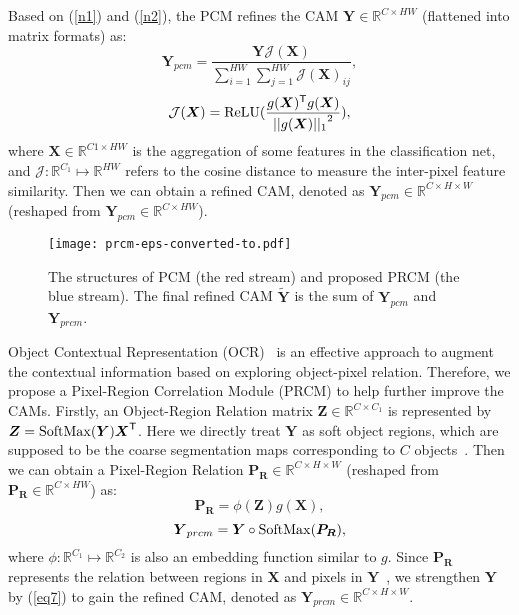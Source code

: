 \documentclass[10pt,twocolumn,letterpaper]{article}
\begin{document}
Based on (\ref{n1}) and (\ref{n2}), the PCM refines the CAM $\boldsymbol{Y} \in \mathbb{R}^{C \times HW}$ (flattened into matrix formats) as:
\begin{equation}\label{eq4}
{\boldsymbol{Y}_{pcm}} = \frac{\boldsymbol{Y}\mathcal{J}(\boldsymbol{X})}{\sum\nolimits_{i = 1}^{HW} {\sum\nolimits_{j = 1}^{HW}\mathcal{J}(\boldsymbol{X})_{ij}}},
\end{equation}
\begin{equation}\label{eq5}
\mathcal{J}(\boldsymbol{X}) = {\mathop{\rm ReLU}}(\frac{g(\boldsymbol{X})^\mathsf{T}g(\boldsymbol{X})} {{||g(\boldsymbol{X})||_1}^2}),
\end{equation}
where $\boldsymbol{X} \in \mathbb{R}^{C1 \times HW}$ is the aggregation of some features in the classification net, and $\mathcal{J}:\mathbb{R}^{C_1}\mapsto\mathbb{R}^{HW}$ refers to the cosine distance to measure the inter-pixel feature similarity. Then we can obtain a refined CAM, denoted as ${\boldsymbol{Y}_{pcm}} \in {\mathbb{R}^{C \times H \times W}}$ (reshaped from ${\boldsymbol{Y}_{pcm}} \in {\mathbb{R}^{C \times HW}}$).
\begin{figure}
\begin{center}
\texttt{[image: prcm-eps-converted-to.pdf]}
\end{center}
\vspace{-4mm}
   \caption{The structures of PCM (the red stream) and proposed PRCM (the blue stream). The final refined CAM $\widetilde {\boldsymbol{Y}}$ is the sum of $\boldsymbol{Y}_{pcm}$ and $\boldsymbol{Y}_{prcm}$.}
\label{fig:prcm}
\vspace{-2mm}
\end{figure}

Object Contextual Representation (OCR)~\cite{OCR} is an effective approach to augment the contextual information based on exploring object-pixel relation. Therefore, we propose a Pixel-Region Correlation Module (PRCM) to help further improve the CAMs. Firstly, an Object-Region Relation matrix $\boldsymbol{Z} \in {\mathbb{R}^{C \times C_1}}$ is represented by $\boldsymbol{Z} = \mathop{\rm SoftMax}(\boldsymbol{Y})\boldsymbol{X}^\mathsf{T}$. Here we directly treat $\boldsymbol{Y}$ as soft object regions, which are supposed to be the coarse segmentation maps corresponding to $C$ objects~\cite{OCR}. Then we can obtain a Pixel-Region Relation $ {\boldsymbol{P_{R}}} \in {\mathbb{R}^{C \times H \times W}}$ (reshaped from $ \boldsymbol{P_{R}} \in {\mathbb{R}^{C \times HW}}$) as:
\begin{equation}\label{eq6}
\boldsymbol {P_{R}} = \phi (\boldsymbol{Z})g(\boldsymbol{X}),
\end{equation}
\begin{equation}\label{eq7}
\boldsymbol{Y}_{prcm} = {\boldsymbol{Y}} \circ \mathop{\rm SoftMax}({\boldsymbol{P_{R}}}),
\end{equation}
where $\phi:\mathbb{R}^{C_1}\mapsto\mathbb{R}^{C_2}$ is also an embedding function similar to $g$. Since $\boldsymbol{P_{R}}$ represents the relation between regions in $\boldsymbol{X}$ and pixels in $\boldsymbol{Y}$~\cite{OCR}, we strengthen $\boldsymbol{Y}$ by (\ref{eq7}) to gain the refined CAM, denoted as ${\boldsymbol{Y}_{prcm}} \in {\mathbb{R}^{C \times H \times W}}$.
\end{document}
